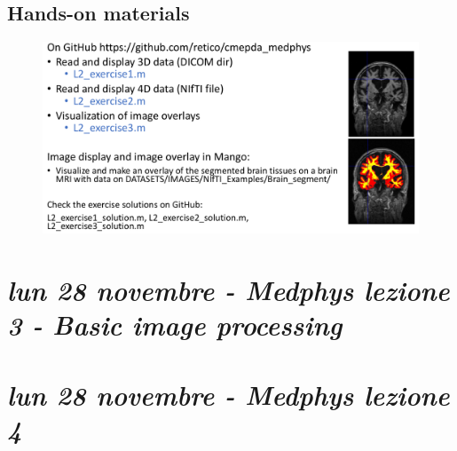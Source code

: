 \subsection{Hands-on materials}
\begin{figure}[ht]
	\centering
	\includegraphics[width=1\linewidth]{figure_med/hands-on-med}
\end{figure}
\FloatBarrier


\newpage
\section{\textit{lun 28 novembre - Medphys lezione 3 - Basic image processing}}




\section{\textit{lun 28 novembre - Medphys lezione 4}}